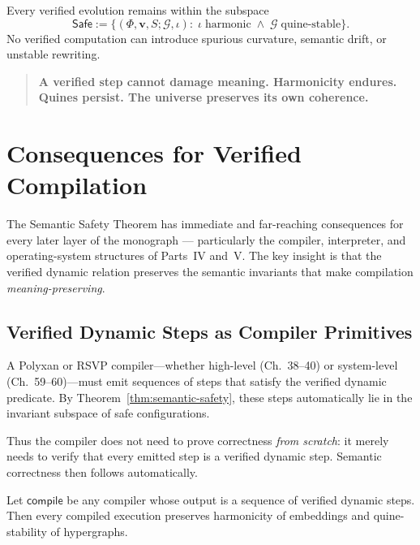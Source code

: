 \begin{corollary}
Every verified evolution remains within the subspace
\[
\mathsf{Safe}
:= \{
(\Phi,\mathbf{v},S;\mathcal{G},\iota)
:\;
\iota\;\text{harmonic}
\;\wedge\;
\mathcal{G}\;\text{quine-stable}
\}.
\]
No verified computation can introduce spurious curvature,
semantic drift, or unstable rewriting.
\end{corollary}

\begin{quote}
\textbf{A verified step cannot damage meaning.  
Harmonicity endures.  
Quines persist.  
The universe preserves its own coherence.}
\end{quote}

\section{Consequences for Verified Compilation}
\label{sec:37-consequences}

The Semantic Safety Theorem has immediate and far-reaching consequences
for every later layer of the monograph --- particularly the compiler,
interpreter, and operating-system structures of Parts~IV and~V.
The key insight is that the verified dynamic relation preserves the
semantic invariants that make compilation \emph{meaning-preserving}.

\subsection{Verified Dynamic Steps as Compiler Primitives}

A Polyxan or RSVP compiler---whether high-level (Ch.~38--40) or
system-level (Ch.~59--60)---must emit sequences of steps that satisfy
the verified dynamic predicate.  
By Theorem~\ref{thm:semantic-safety}, these steps automatically lie in
the invariant subspace of safe configurations.

Thus the compiler does not need to prove correctness \emph{from scratch}:
it merely needs to verify that every emitted step is a verified dynamic
step.  
Semantic correctness then follows automatically.

\begin{proposition}
\label{prop:compiler-soundness}
Let $\mathsf{compile}$ be any compiler whose output is a sequence of
verified dynamic steps.
Then every compiled execution preserves harmonicity of embeddings
and quine-stability of hypergraphs.
\end{proposition}

